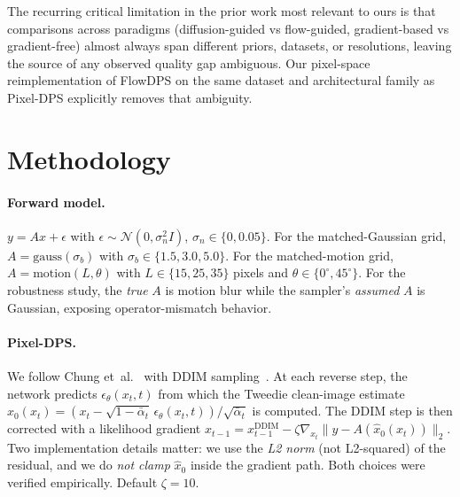 \documentclass{article}
\begin{document}
The recurring critical limitation in the prior work most relevant to
ours is that comparisons across paradigms (diffusion-guided vs
flow-guided, gradient-based vs gradient-free) almost always span
different priors, datasets, or resolutions, leaving the source of any
observed quality gap ambiguous. Our pixel-space reimplementation of
FlowDPS on the same dataset and architectural family as Pixel-DPS
explicitly removes that ambiguity.

\section{Methodology}

\paragraph{Forward model.} $y = A x + \epsilon$ with
$\epsilon \sim \mathcal{N}(0, \sigma_n^2 I)$, $\sigma_n \in \{0, 0.05\}$.
For the matched-Gaussian grid, $A = \text{gauss}(\sigma_b)$ with
$\sigma_b \in \{1.5, 3.0, 5.0\}$. For the matched-motion grid,
$A = \text{motion}(L, \theta)$ with $L \in \{15, 25, 35\}$ pixels and
$\theta \in \{0^\circ, 45^\circ\}$. For the robustness study, the
\emph{true} $A$ is motion blur while the sampler's \emph{assumed} $A$
is Gaussian, exposing operator-mismatch behavior.

\paragraph{Pixel-DPS.} We follow Chung et~al.~\citep{chung2023dps}
with DDIM sampling~\citep{song2021ddim}. At each reverse step, the
network predicts $\epsilon_\theta(x_t, t)$ from which the Tweedie
clean-image estimate
$\hat x_0(x_t) = (x_t - \sqrt{1-\bar\alpha_t}\,\epsilon_\theta(x_t,t)) / \sqrt{\bar\alpha_t}$
is computed. The DDIM step is then corrected with a likelihood
gradient
$x_{t-1} = x_{t-1}^{\text{DDIM}} - \zeta \nabla_{x_t} \|y - A(\hat x_0(x_t))\|_2$.
Two implementation details matter: we use the \emph{L2 norm} (not
L2-squared) of the residual, and we do \emph{not clamp} $\hat x_0$
inside the gradient path. Both choices were verified empirically.
Default $\zeta{=}10$.
\end{document}
